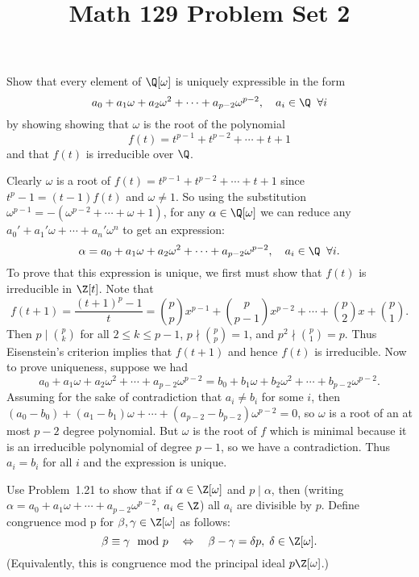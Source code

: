 \documentclass[11pt,letterpaper]{article}
\title{\textbf{Math 129 Problem Set 2}}
\begin{document}
\maketitle

\begin{cproblem}{1.21}
    Show that every element of $\Q[\omega]$ is uniquely expressible in the form
    \[
        a_0+a_1\omega+a_2\omega^2+\cdots+a_{p-2}\omega^{p-2}, \quad a_i\in \Q\;\;\forall i
    \] 
    by showing showing that $\omega$ is the root of the polynomial 
    \[
        f(t)=t^{p-1}+t^{p-2}+\cdots+t+1
    \]
    and that $f(t)$ is irreducible over $\Q$. 
\end{cproblem}


\begin{solution}
    Clearly $\omega$ is a root of $f(t)=t^{p-1}+t^{p-2}+\cdots+t+1$ since $t^p-1=(t-1)f(t)$ and $\omega\neq 1$. So using the substitution $\omega^{p-1}=-(\omega^{p-2}+\cdots + \omega+1)$, for any $\alpha\in \Q[\omega]$ we can reduce any $a_0'+a_1'\omega+\cdots+a_n'\omega^n$ to get an expression:
    \[
        \alpha = a_0+a_1\omega+a_2\omega^2+\cdots+a_{p-2}\omega^{p-2},\quad a_i\in \Q\;\;\forall i
    .\]   
    To prove that this expression is unique, we first must show that $f(t)$ is irreducible in $\Z[t]$. Note that
    \[
        f(t+1)=\frac{(t+1)^p-1}{t}=\binom{p}{p}x^{p-1} + \binom{p}{p-1}x^{p-2}+\cdots + \binom{p}{2}x+\binom{p}{1}
    .\]  
    Then $p\mid \binom{p}{k}$ for all $2\leq k\leq p-1$, $p\nmid \binom{p}{p}=1$, and $p^2\nmid \binom{p}{1}=p$. Thus Eisenstein's criterion implies that $f(t+1)$ and hence $f(t)$ is irreducible. Now to prove uniqueness, suppose we had
    \[
        a_0+a_1\omega+a_2\omega^2+\cdots+a_{p-2}\omega^{p-2}=b_0+b_1\omega+b_2\omega^2+\cdots+b_{p-2}\omega^{p-2}
    .\]    
    Assuming for the sake of contradiction that $a_i\neq b_i$ for some $i$, then $(a_0-b_0)+(a_1-b_1)\omega+\cdots+(a_{p-2}-b_{p-2})\omega^{p-2}=0$, so $\omega$ is a root of an at most $p-2$ degree polynomial. But $\omega$ is the root of $f$ which is minimal because it is an irreducible polynomial of degree $p-1$, so we have a contradiction. Thus $a_i=b_i$ for all $i$ and the expression is unique.
\end{solution}

\begin{cproblem}{1.22}
    Use Problem~1.21 to show that if $\alpha\in \Z[\omega]$ and $p\mid \alpha$, then (writing $\alpha=a_0+a_1\omega+\cdots+a_{p-2}\omega^{p-2}$, $a_i\in \Z$) all $a_i$ are divisible by $p$. Define congruence mod p for $\beta, \gamma \in \Z[\omega]$ as follows: 
    \[
        \beta\equiv \gamma \mod{p}\quad\Leftrightarrow\quad \beta-\gamma = \delta p,\; \delta\in \Z[\omega]
    .\] 
    (Equivalently, this is congruence mod the principal ideal $p\Z[\omega]$.)
\end{cproblem}
\end{document}
